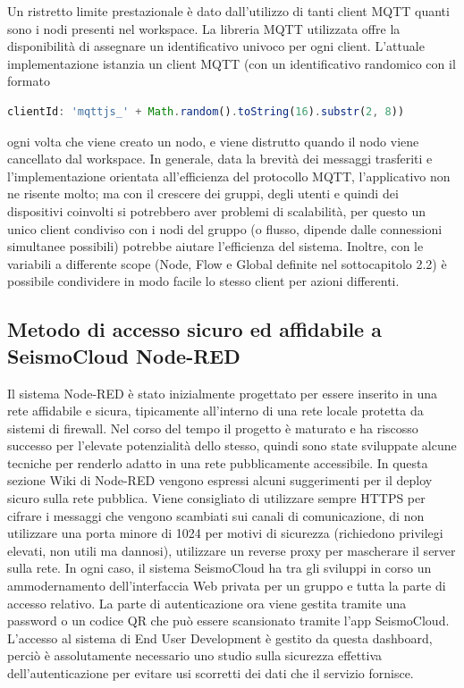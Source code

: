 \documentclass[a4paper,10pt]{memoir}
\begin{document}
Un ristretto limite prestazionale è dato dall'utilizzo di tanti client MQTT quanti sono i nodi presenti nel workspace. La libreria MQTT utilizzata offre la disponibilità di assegnare un identificativo univoco per ogni client.
L'attuale implementazione istanzia un client MQTT (con un identificativo randomico con il formato 
\begin{lstlisting}[language=Javascript]
clientId: 'mqttjs_' + Math.random().toString(16).substr(2, 8))
\end{lstlisting}
ogni volta che viene creato un nodo, e viene distrutto quando il nodo viene cancellato dal workspace.
In generale, data la brevità dei messaggi trasferiti e l'implementazione orientata all'efficienza del protocollo MQTT, l'applicativo non ne risente molto; ma con il crescere dei gruppi, degli utenti e quindi dei dispositivi coinvolti si potrebbero aver problemi di scalabilità, per questo un unico client condiviso con i nodi del gruppo (o flusso, dipende dalle connessioni simultanee possibili) potrebbe aiutare l'efficienza del sistema.
Inoltre, con le variabili a differente scope (Node, Flow e Global definite nel sottocapitolo 2.2) è possibile condividere in modo facile lo stesso client per azioni differenti.

\subsection{Metodo di accesso sicuro ed affidabile a SeismoCloud Node-RED}

Il sistema Node-RED è stato inizialmente progettato per essere inserito in una rete affidabile e sicura, tipicamente all'interno di una rete locale protetta da sistemi di firewall. Nel corso del tempo il progetto è maturato e ha riscosso  successo per l'elevate potenzialità dello stesso, quindi sono state sviluppate alcune tecniche per renderlo adatto in una rete pubblicamente accessibile.
In questa sezione Wiki di Node-RED \cite{node-red-internet} vengono espressi alcuni suggerimenti per il deploy sicuro sulla rete pubblica.
Viene consigliato di utilizzare sempre HTTPS per cifrare i messaggi che vengono scambiati sui canali di comunicazione, di non utilizzare una porta minore di 1024 per motivi di sicurezza (richiedono privilegi elevati, non utili ma dannosi), utilizzare un reverse proxy per mascherare il server sulla rete. In ogni caso, il sistema SeismoCloud ha tra gli sviluppi in corso un ammodernamento dell'interfaccia Web privata per un gruppo e tutta la parte di accesso relativo. La parte di autenticazione ora viene gestita tramite una password o un codice QR che può essere scansionato tramite l'app SeismoCloud. L'accesso al sistema di End User Development è gestito da questa dashboard, perciò è assolutamente necessario uno studio sulla sicurezza effettiva dell'autenticazione per evitare usi scorretti dei dati che il servizio fornisce.
\end{document}
